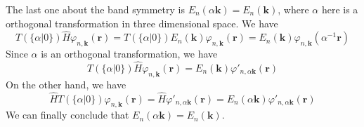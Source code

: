 \documentclass{article}
\begin{document}
The last one about the band symmetry is $E_n(\alpha\mathbf{k})=E_n(\mathbf{k})$, where $\alpha$ here is a orthogonal transformation in three dimensional space. We have\begin{equation}
    T(\{\alpha|0\})\hat{H}\varphi_{n,\mathbf{k}}(\mathbf{r})= T(\{\alpha|0\})E_n(\mathbf{k})\varphi_{n,\mathbf{k}}(\mathbf{r})=E_n(\mathbf{k})\varphi_{n,\mathbf{k}}(\alpha^{-1}\mathbf{r})
\end{equation}Since $\alpha$ is an orthogonal transformation, we have\begin{equation}
    T(\{\alpha|0\})\hat{H}\varphi_{n,\mathbf{k}}(\mathbf{r})=E_n(\mathbf{k})\varphi'_{n,\alpha\mathbf{k}}(\mathbf{r})
\end{equation}On the other hand, we have\begin{equation}
    \hat{H}T(\{\alpha|0\})\varphi_{n,\mathbf{k}}(\mathbf{r})=\hat{H}\varphi'_{n,\alpha\mathbf{k}}(\mathbf{r})=E_n(\alpha\mathbf{k})\varphi'_{n,\alpha\mathbf{k}}(\mathbf{r})
\end{equation}We can finally conclude that $E_n(\alpha\mathbf{k})=E_n(\mathbf{k})$.
\end{document}
